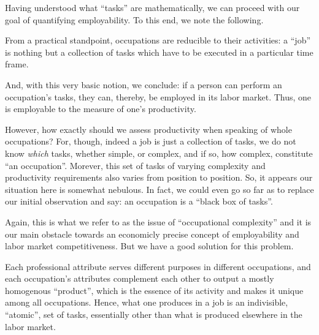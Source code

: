 \documentclass[hidelinks, nonatbib]{elsarticle}
\begin{document}
Having understood what ``tasks'' are mathematically, we can proceed with our goal of quantifying employability. To this end, we note the following.

\begin{observation}
    \label{oro}
    From a practical standpoint, occupations are reducible to their activities: a ``job'' is nothing but a collection of tasks which have to be executed in a particular time frame.
\end{observation}

And, with this very basic notion, we conclude: if a person can perform an occupation's tasks, they can, thereby, be employed in its labor market. Thus, one is employable to the measure of one's productivity.

However, how exactly should we assess productivity when speaking of whole occupations? For, though, indeed a job is just a collection of tasks, we do not know \textit{which} tasks, whether simple, or complex, and if so, how complex, constitute ``an occupation''. Morever, this set of tasks of varying complexity and productivity requirements also varies from position to position. So, it appears our situation here is somewhat nebulous. In fact, we could even go so far as to replace our initial observation and say: an occupation is a ``black box of tasks''.

Again, this is what we refer to as the issue of ``occupational complexity'' and it is our main obstacle towards an economicly precise concept of employability and labor market competitiveness. But we have a good solution for this problem.

\begin{observation}
    \label{oao}
    Each professional attribute serves different purposes in different occupations, and each occupation's attributes complement each other to output a mostly homogenous ``product'', which is the essence of its activity and makes it unique among all occupations. Hence, what one produces in a job is an indivisible, ``atomic'', set of tasks, essentially other than what is produced elsewhere in the labor market.
\end{observation}

\end{document}
